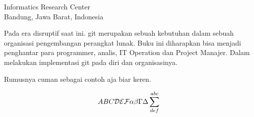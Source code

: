 
{Informatics Research Center\\
Bandung, Jawa Barat, Indonesia}


Pada era disruptif   
saat ini. git merupakan sebuah kebutuhan dalam sebuah organisasi pengembangan perangkat lunak.
Buku ini diharapkan bisa menjadi penghantar para programmer, analis, IT Operation dan Project Manajer.
Dalam melakukan implementasi git pada diri dan organisasinya.

Rumusnya cuman sebagai contoh aja biar keren\cite{awangga2018sampeu}.

\begin{equation}
ABC {\cal DEF} \alpha\beta\Gamma\Delta\sum^{abc}_{def}
\end{equation}